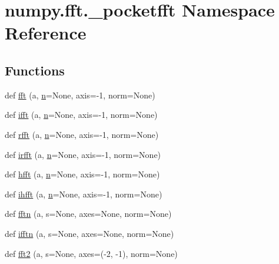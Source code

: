 \hypertarget{namespacenumpy_1_1fft_1_1__pocketfft}{}\section{numpy.\+fft.\+\_\+pocketfft Namespace Reference}
\label{namespacenumpy_1_1fft_1_1__pocketfft}
\subsection*{Functions}
\begin{DoxyCompactItemize}
\item 
def \hyperlink{namespacenumpy_1_1fft_1_1__pocketfft_a31595a509daa5cadd8c6f7f843d94b04}{fft} (a, \hyperlink{namespacenumpy_a352663c52853d2754274407d5cae2832}{n}=None, axis=-\/1, norm=None)
\item 
def \hyperlink{namespacenumpy_1_1fft_1_1__pocketfft_a4a109df32561e0f5460d773f89cb571d}{ifft} (a, \hyperlink{namespacenumpy_a352663c52853d2754274407d5cae2832}{n}=None, axis=-\/1, norm=None)
\item 
def \hyperlink{namespacenumpy_1_1fft_1_1__pocketfft_a6dddded3ebee31e4163fc5278d7591e3}{rfft} (a, \hyperlink{namespacenumpy_a352663c52853d2754274407d5cae2832}{n}=None, axis=-\/1, norm=None)
\item 
def \hyperlink{namespacenumpy_1_1fft_1_1__pocketfft_a38af6eaf756a8aa41136f64e82256fc9}{irfft} (a, \hyperlink{namespacenumpy_a352663c52853d2754274407d5cae2832}{n}=None, axis=-\/1, norm=None)
\item 
def \hyperlink{namespacenumpy_1_1fft_1_1__pocketfft_a2f7c39f823dbf6bdf03a10788f66d82b}{hfft} (a, \hyperlink{namespacenumpy_a352663c52853d2754274407d5cae2832}{n}=None, axis=-\/1, norm=None)
\item 
def \hyperlink{namespacenumpy_1_1fft_1_1__pocketfft_aaf5afee21f4173f2f52ab5a30e5e25b0}{ihfft} (a, \hyperlink{namespacenumpy_a352663c52853d2754274407d5cae2832}{n}=None, axis=-\/1, norm=None)
\item 
def \hyperlink{namespacenumpy_1_1fft_1_1__pocketfft_af0149dee6ab2d37a65bdd9cb306e0684}{fftn} (a, s=None, axes=None, norm=None)
\item 
def \hyperlink{namespacenumpy_1_1fft_1_1__pocketfft_a3131f46333aa203c817efbca1a750913}{ifftn} (a, s=None, axes=None, norm=None)
\item 
def \hyperlink{namespacenumpy_1_1fft_1_1__pocketfft_ad62d1159321b978a20ec8303704101cc}{fft2} (a, s=None, axes=(-\/2, -\/1), norm=None)
\item 

\end{DoxyCompactItemize}
